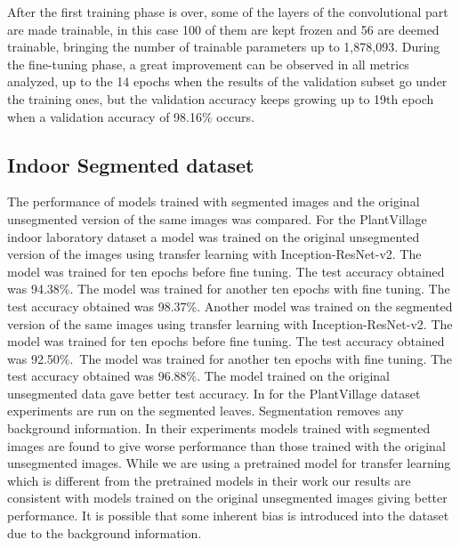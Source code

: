 \documentclass[conference]{IEEEtran}
\begin{document}
After the first training phase is over, some of the layers of the convolutional part are made trainable, in this case 100 of them are kept frozen and 56 are deemed trainable, bringing the number of trainable parameters up to 1,878,093. During the fine-tuning phase, a great improvement can be observed in all metrics analyzed, up to the 14 epochs when the results of the validation subset go under the training ones, but the validation accuracy keeps growing up to 19th epoch when a validation accuracy of 98.16\% occurs. 

\subsection{Indoor Segmented dataset}
 

The performance of models trained with segmented images and the original unsegmented version of the same images was compared. For the PlantVillage indoor laboratory dataset a model was trained on the original unsegmented version of the images using transfer learning with Inception-ResNet-v2. The model was trained for ten epochs before fine tuning. The test accuracy obtained was 94.38\%. The model was trained for another ten epochs with fine tuning. The test accuracy obtained was 98.37\%. Another model was trained on the segmented version of the same images using transfer learning with Inception-ResNet-v2. The model was trained for ten epochs before fine tuning. The test accuracy obtained was 92.50\%.\
 The model was trained for another ten epochs with fine tuning. The test accuracy obtained was 96.88\%. The model trained on the original unsegmented data gave better test accuracy. In \cite{mohanty2016using} for the PlantVillage dataset experiments are run on the segmented leaves. Segmentation removes any background information. In their experiments models trained with segmented images are found to give worse performance than those trained with the original unsegmented images. While we are using a pretrained model for transfer learning which is different from the pretrained models in their work our results are consistent with models trained on the original unsegmented images giving better performance. It is possible that some inherent bias is introduced into the dataset due to the background information.   \ 
\end{document}

